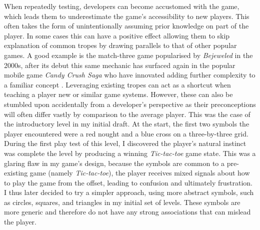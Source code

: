 \documentclass[final]{cmpreport}
\begin{document}
When repeatedly testing, developers can become accustomed with the game, which leads them to underestimate the game's accessibility to new players. This often takes the form of unintentionally assuming prior knowledge on part of the player. In some cases this can have a positive effect allowing them to skip explanation of common tropes by drawing parallels to that of other popular games. A good example is the match-three game popularised by \textit{Bejeweled} in the 2000s, after its debut this same mechanic has surfaced again in the popular mobile game \textit{Candy Crush Saga} who have innovated adding further complexity to a familiar concept \citep{Juul}. Leveraging existing tropes can act as a shortcut when teaching a player new or similar game systems. However, these can also be stumbled upon accidentally from a developer's perspective as their preconceptions will often differ vastly by comparison to the average player. This was the case of the introductory level in my initial draft. At the start, the first two symbols the player encountered were a red nought and a blue cross on a three-by-three grid. During the first play test of this level, I discovered the player's natural instinct was complete the level by producing a winning \emph{Tic-tac-toe} game state. This was a glaring flaw in my game's design, because the symbols are common to a pre-existing game (namely \emph{Tic-tac-toe}), the player receives mixed signals about how to play the game from the offset, leading to confusion and ultimately frustration. I thus later decided to try a simpler approach, using more abstract symbols, such as circles, squares, and triangles in my initial set of levels. These symbols are more generic and therefore do not have any strong associations that can mislead the player.
\end{document}
